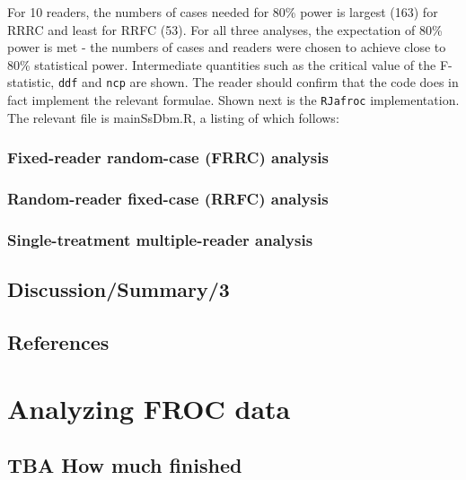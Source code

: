 \documentclass[
]{book}
\begin{document}
For 10 readers, the numbers of cases needed for 80\% power is largest (163) for RRRC and least for RRFC (53). For all three analyses, the expectation of 80\% power is met - the numbers of cases and readers were chosen to achieve close to 80\% statistical power. Intermediate quantities such as the critical value of the F-statistic, \texttt{ddf} and \texttt{ncp} are shown. The reader should confirm that the code does in fact implement the relevant formulae. Shown next is the \texttt{RJafroc} implementation. The relevant file is mainSsDbm.R, a listing of which follows:

\hypertarget{roc-sample-size-or-FRRCAnalysis}{%
\subsection{Fixed-reader random-case (FRRC) analysis}\label{roc-sample-size-or-FRRCAnalysis}}

\hypertarget{roc-sample-size-or-RRFCAnalysis}{%
\subsection{Random-reader fixed-case (RRFC) analysis}\label{roc-sample-size-or-RRFCAnalysis}}

\hypertarget{roc-sample-size-or-STMRAnalysis}{%
\subsection{Single-treatment multiple-reader analysis}\label{roc-sample-size-or-STMRAnalysis}}

\hypertarget{discussionsummary3}{%
\section{Discussion/Summary/3}\label{discussionsummary3}}

\hypertarget{roc-sample-size-or-references}{%
\section{References}\label{roc-sample-size-or-references}}

\hypertarget{analyzing-froc-data}{%
\chapter{Analyzing FROC data}\label{analyzing-froc-data}}

\hypertarget{analyzing-froc-data-how-much-finished}{%
\section{TBA How much finished}\label{analyzing-froc-data-how-much-finished}}
\end{document}
